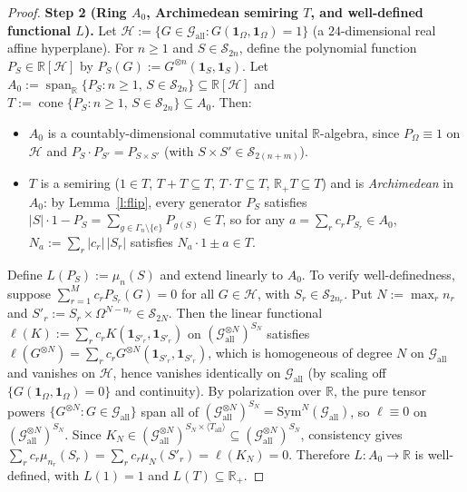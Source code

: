\documentclass[11pt,a4paper]{article}
\theoremstyle{definition}
\theoremstyle{remark}
\newcommand{\ind}[1]{\mathbf{1}_{#1}}
\newcommand{\Gall}{\mathcal{G}_{\mathrm{all}}}
\newcommand{\Sym}{\mathrm{Sym}}
\DeclareMathOperator{\spanop}{span}
\begin{document}
\begin{proof}
\medskip\noindent\textbf{Step 2 (Ring $A_0$, Archimedean semiring $T$, and well-defined functional $L$).}
Let $\mathcal{H} := \{G \in \Gall : G(\ind\Omega, \ind\Omega) = 1\}$ (a $24$-dimensional real affine hyperplane). For $n \ge 1$ and $S \in \mathcal{S}_{2n}$, define the polynomial function $P_S \in \mathbb{R}[\mathcal{H}]$ by $P_S(G) := G^{\otimes n}(\ind S, \ind S)$. Let $A_0 := \spanop_{\mathbb{R}}\{P_S : n \ge 1,\, S \in \mathcal{S}_{2n}\} \subseteq \mathbb{R}[\mathcal{H}]$ and $T := \operatorname{cone}\{P_S : n \ge 1,\, S \in \mathcal{S}_{2n}\} \subseteq A_0$. Then:
\begin{itemize}
  \item $A_0$ is a countably-dimensional commutative unital $\mathbb{R}$-algebra, since $P_\Omega \equiv 1$ on $\mathcal{H}$ and $P_S \cdot P_{S'} = P_{S \times S'}$ (with $S \times S' \in \mathcal{S}_{2(n+m)}$).
  \item $T$ is a semiring ($1 \in T$, $T + T \subseteq T$, $T \cdot T \subseteq T$, $\mathbb{R}_+ T \subseteq T$) and is \emph{Archimedean} in $A_0$: by Lemma~\ref{l:flip}, every generator $P_S$ satisfies $|S| \cdot 1 - P_S = \sum_{g \in \Gamma_n \setminus \{e\}} P_{g(S)} \in T$, so for any $a = \sum_r c_r P_{S_r} \in A_0$, $N_a := \sum_r |c_r|\,|S_r|$ satisfies $N_a \cdot 1 \pm a \in T$.
\end{itemize}

Define $L(P_S) := \mu_n(S)$ and extend linearly to $A_0$. To verify well-definedness, suppose $\sum_{r=1}^M c_r P_{S_r}(G) = 0$ for all $G \in \mathcal{H}$, with $S_r \in \mathcal{S}_{2 n_r}$. Put $N := \max_r n_r$ and $S'_r := S_r \times \Omega^{N - n_r} \in \mathcal{S}_{2N}$. Then the linear functional $\ell(K) := \sum_r c_r K(\ind{S'_r}, \ind{S'_r})$ on $(\Gall^{\otimes N})^{S_N}$ satisfies $\ell(G^{\otimes N}) = \sum_r c_r G^{\otimes N}(\ind{S'_r}, \ind{S'_r})$, which is homogeneous of degree $N$ on $\Gall$ and vanishes on $\mathcal{H}$, hence vanishes identically on $\Gall$ (by scaling off $\{G(\ind\Omega, \ind\Omega) = 0\}$ and continuity). By polarization over $\mathbb{R}$, the pure tensor powers $\{G^{\otimes N} : G \in \Gall\}$ span all of $(\Gall^{\otimes N})^{S_N} = \Sym^N(\Gall)$, so $\ell \equiv 0$ on $(\Gall^{\otimes N})^{S_N}$. Since $K_N \in (\Gall^{\otimes N})^{S_N \times \langle T_{\mathrm{all}} \rangle} \subseteq (\Gall^{\otimes N})^{S_N}$, consistency gives $\sum_r c_r \mu_{n_r}(S_r) = \sum_r c_r \mu_N(S'_r) = \ell(K_N) = 0$. Therefore $L : A_0 \to \mathbb{R}$ is well-defined, with $L(1) = 1$ and $L(T) \subseteq \mathbb{R}_+$.


\end{proof}
\end{document}
